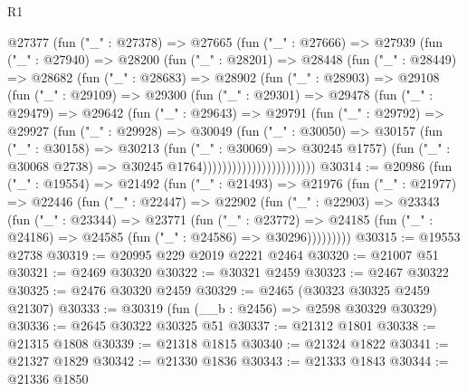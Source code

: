 \begin{lexlean}{R1}
\begin{coremodule}
                @27377
                  (fun ("_" : @27378) =>
                  @27665
                    (fun ("_" : @27666) =>
                    @27939
                      (fun ("_" : @27940) =>
                      @28200
                        (fun ("_" : @28201) =>
                        @28448
                          (fun ("_" : @28449) =>
                          @28682
                            (fun ("_" : @28683) =>
                            @28902
                              (fun ("_" : @28903) =>
                              @29108
                                (fun ("_" : @29109) =>
                                @29300
                                  (fun ("_" : @29301) =>
                                  @29478
                                    (fun ("_" : @29479) =>
                                    @29642
                                      (fun ("_" : @29643) =>
                                      @29791
                                        (fun ("_" : @29792) =>
                                        @29927
                                          (fun ("_" : @29928) =>
                                          @30049
                                            (fun ("_" : @30050) =>
                                            @30157
                                              (fun ("_" : @30158) =>
                                              @30213
                                                (fun ("_" : @30069) => @30245 @1757)
                                                (fun ("_" : @30068 @2738) =>
                                                @30245 @1764)))))))))))))))))))))))
@30314 := @20986
    (fun ("_" : @19554) =>
    @21492
      (fun ("_" : @21493) =>
      @21976
        (fun ("_" : @21977) =>
        @22446
          (fun ("_" : @22447) =>
          @22902
            (fun ("_" : @22903) =>
            @23343
              (fun ("_" : @23344) =>
              @23771
                (fun ("_" : @23772) =>
                @24185 (fun ("_" : @24186) => @24585 (fun ("_" : @24586) => @30296)))))))))
@30315 := @19553 @2738
@30319 := @20995 @229 @2019 @2221 @2464
@30320 := @21007 @51
@30321 := @2469 @30320
@30322 := @30321 @2459
@30323 := @2467 @30322
@30325 := @2476 @30320 @2459
@30329 := @2465 (@30323 @30325 @2459 @21307)
@30333 := @30319 (fun (__b : @2456) => @2598 @30329 @30329)
@30336 := @2645 @30322 @30325 @51
@30337 := @21312 @1801
@30338 := @21315 @1808
@30339 := @21318 @1815
@30340 := @21324 @1822
@30341 := @21327 @1829
@30342 := @21330 @1836
@30343 := @21333 @1843
@30344 := @21336 @1850

\end{coremodule}
\end{lexlean}
